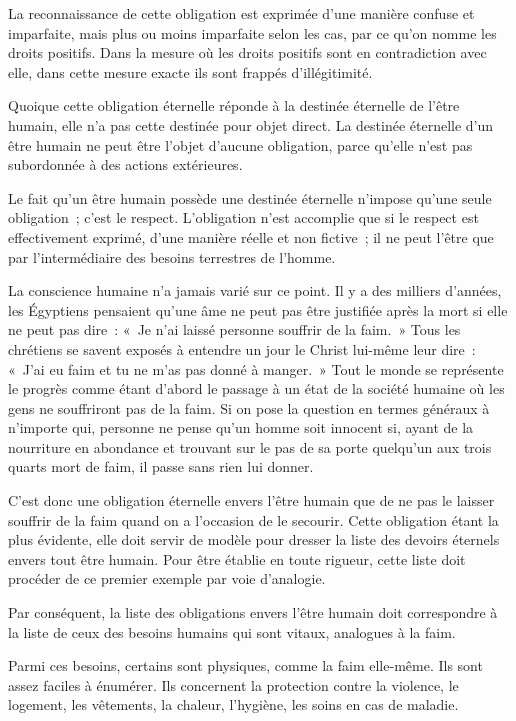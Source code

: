 \documentclass[french,twoside]{book} %
\begin{document}
La reconnaissance de cette obligation est exprimée d'une manière confuse et imparfaite, mais plus ou moins imparfaite selon les cas, par ce qu'on nomme les droits positifs. Dans la mesure où les droits positifs sont en contradiction avec elle, dans cette mesure exacte ils sont frappés d'illégitimité.\par
Quoique cette obligation éternelle réponde à la destinée éternelle de l'être humain, elle n'a pas cette destinée pour objet direct. La destinée éternelle d'un être humain ne peut être l'objet d'aucune obligation, parce qu'elle n'est pas subordonnée à des actions extérieures.\par
Le fait qu'un être humain possède une destinée éternelle n'impose qu'une seule obligation ; c'est le respect. L'obligation n'est accomplie que si le respect est effectivement exprimé, d'une manière réelle et non fictive ; il ne peut l'être que par l'intermédiaire des besoins terrestres de l'homme.\par
La conscience humaine n'a jamais varié sur ce point. Il y a des milliers d'années, les Égyptiens pensaient qu'une âme ne peut pas être justifiée après la mort si elle ne peut pas dire : « Je n'ai laissé personne souffrir de la faim. » Tous les chrétiens se savent exposés à entendre un jour le Christ lui-même leur dire : « J'ai eu faim et tu ne m’as pas donné à manger. » Tout le monde se représente le progrès comme étant d'abord le passage à un état de la société humaine où les gens ne souffriront pas de la faim. Si on pose la question en termes généraux à n'importe qui, personne ne pense qu'un homme soit innocent si, ayant de la nourriture en abondance et trouvant sur le pas de sa porte quelqu'un aux trois quarts mort de faim, il passe sans rien lui donner.\par
C'est donc une obligation éternelle envers l'être humain que de ne pas le laisser souffrir de la faim quand on a l'occasion de le secourir. Cette obligation étant la plus évidente, elle doit servir de modèle pour dresser la liste des devoirs éternels envers tout être humain. Pour être établie en toute rigueur, cette liste doit procéder de ce premier exemple par voie d'analogie.\par
Par conséquent, la liste des obligations envers l'être humain doit correspondre à la liste de ceux des besoins humains qui sont vitaux, analogues à la faim.\par
Parmi ces besoins, certains sont physiques, comme la faim elle-même. Ils sont assez faciles à énumérer. Ils concernent la protection contre la violence, le logement, les vêtements, la chaleur, l'hygiène, les soins en cas de maladie.\par
\end{document}
